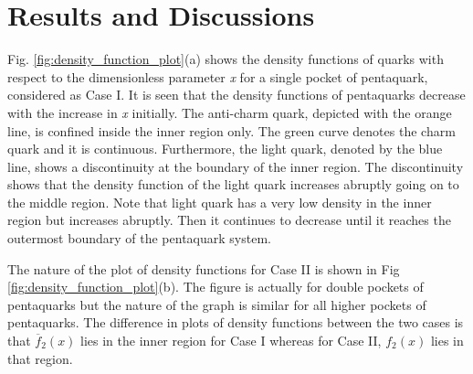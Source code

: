 \documentclass[preprint,12pt]{elsarticle}
\begin{document}
        
\section{Results and Discussions}
    Fig. \ref{fig:density_function_plot}(a) shows the density functions of quarks with respect to the dimensionless parameter \textit{x} for a single pocket of pentaquark, considered as Case I. It is seen that the density functions of pentaquarks decrease with the increase in \textit{x} initially. The anti-charm quark, depicted with the orange line, is confined inside the inner region only. The green curve denotes the charm quark and it is continuous. Furthermore, the light quark, denoted by the blue line, shows a discontinuity at the boundary of the inner region. The discontinuity shows that the density function of the light quark increases abruptly going on to the middle region. Note that light quark has a very low density in the inner region but increases abruptly. Then it continues to decrease until it reaches the outermost boundary of the pentaquark system.      
        
    The nature of the plot of density functions for Case II is shown in Fig \ref{fig:density_function_plot}(b).  The figure is actually for double pockets of pentaquarks but the nature of the graph is similar for all higher pockets of pentaquarks. The difference in plots of density functions between the two cases is that $\overline{f}_{2}(x)$ lies in the inner region for Case I whereas for Case II, $f_{2}(x)$ lies in that region.    
\end{document}
